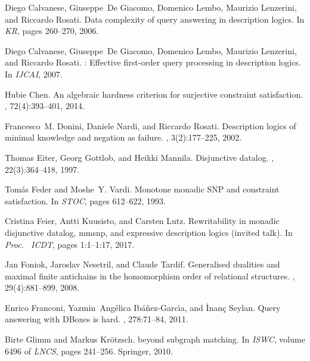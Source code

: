 \documentclass{lmcs}
\theoremstyle{definition}
\begin{document}
\begin{thebibliography}{10}
Diego Calvanese, Giuseppe~De Giacomo, Domenico Lembo, Maurizio Lenzerini, and
  Riccardo Rosati.
\newblock Data complexity of query answering in description logics.
\newblock In {\em KR}, pages 260--270, 2006.

Diego Calvanese, Giuseppe~De Giacomo, Domenico Lembo, Maurizio Lenzerini, and
  Riccardo Rosati.
: Effective first-order query processing in description
  logics.
\newblock In {\em IJCAI}, 2007.

Hubie Chen.
\newblock An algebraic hardness criterion for surjective constraint
  satisfaction.
, 72(4):393--401, 2014.

Francesco~M. Donini, Daniele Nardi, and Riccardo Rosati.
\newblock Description logics of minimal knowledge and negation as failure.
, 3(2):177--225, 2002.

Thomas Eiter, Georg Gottlob, and Heikki Mannila.
\newblock Disjunctive datalog.
, 22(3):364--418, 1997.

Tom{\'a}s Feder and Moshe~Y. Vardi.
\newblock Monotone monadic {S}{N}{P} and constraint satisfaction.
\newblock In {\em STOC}, pages 612--622, 1993.

Cristina Feier, Antti Kuusisto, and Carsten Lutz.
\newblock Rewritability in monadic disjunctive datalog, mmsnp, and expressive
  description logics (invited talk).
\newblock In {\em Proc. \ {ICDT}}, pages 1:1--1:17, 2017.

Jan Foniok, Jaroslav Nesetril, and Claude Tardif.
\newblock Generalised dualities and maximal finite antichains in the
  homomorphism order of relational structures.
, 29(4):881--899, 2008.

Enrico Franconi, Yazmin~Ang{\'e}lica Ib{\'a}{\~n}ez-Garc\'{\i}a, and
  \.{I}nan\c{c} Seylan.
\newblock Query answering with {DB}oxes is hard.
, 278:71--84,
  2011.

Birte Glimm and Markus Kr{\"{o}}tzsch.
 beyond subgraph matching.
\newblock In {\em ISWC}, volume 6496 of {\em LNCS}, pages 241--256. Springer,
  2010.


\end{thebibliography}
\end{document}
